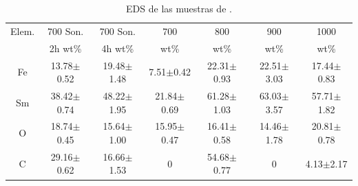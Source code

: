 \documentclass[../main.tex]{subfiles}
\begin{document}
        \begin{table}[H]
            \centering
        \begin{tabular}{|c||c|c|c|c|c|c|}
        \hline
        Elem. &700\gradoC{} Son.&700\gradoC{} Son.&700\gradoC{}&800\gradoC{}&900\gradoC{}&1000\gradoC{}\\
        &2h wt\%&4h wt\%&wt\%&wt\%&wt\%&wt\%\\
        \hline\hline
        Fe &13.78$\pm$0.52&19.48$\pm$1.48& 7.51$\pm$0.42 & 22.31$\pm$0.93 & 22.51$\pm$3.03 & 17.44$\pm$0.83 \\
        Sm &38.42$\pm$0.74&48.22$\pm$1.95& 21.84$\pm$0.69 & 61.28$\pm$1.03 & 63.03$\pm$3.57 & 57.71$\pm$1.82 \\
        O &18.74$\pm$0.45&15.64$\pm$1.00& 15.95$\pm$0.47 & 16.41$\pm$0.58 & 14.46$\pm$1.78 & 20.81$\pm$0.78 \\
        C &29.16$\pm$0.62&16.66$\pm$1.53& 0 & 54.68$\pm$0.77 & 0 & 4.13$\pm$2.17 \\ 
        \hline
        \end{tabular} 
            \caption{EDS de las muestras de \sama{}.}
            \label{tab:EDSSm}
\end{table}
\end{document}
